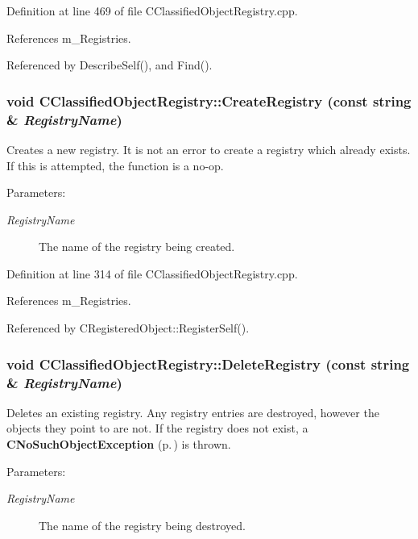 Definition at line 469 of file CClassified\-Object\-Registry.cpp.

References m\_\-Registries.

Referenced by Describe\-Self(), and Find().
\subsubsection{\setlength{\rightskip}{0pt plus 5cm}void CClassified\-Object\-Registry::Create\-Registry (const string \& {\em Registry\-Name})}\label{classCClassifiedObjectRegistry_a3}


Creates a new registry. It is not an error to create a registry which already exists. If this is attempted, the function is a no-op.\begin{Desc}
\item[Parameters: ]\par
\begin{description}
\item[{\em 
Registry\-Name}]The name of the registry being created. \end{description}
\end{Desc}


Definition at line 314 of file CClassified\-Object\-Registry.cpp.

References m\_\-Registries.

Referenced by CRegistered\-Object::Register\-Self().
\subsubsection{\setlength{\rightskip}{0pt plus 5cm}void CClassified\-Object\-Registry::Delete\-Registry (const string \& {\em Registry\-Name})}\label{classCClassifiedObjectRegistry_a4}


Deletes an existing registry. Any registry entries are destroyed, however the objects they point to are not. If the registry does not exist, a {\bf CNo\-Such\-Object\-Exception} {\rm (p.\,\pageref{classCNoSuchObjectException})} is thrown.\begin{Desc}
\item[Parameters: ]\par
\begin{description}
\item[{\em 
Registry\-Name}]The name of the registry being destroyed. \end{description}
\end{Desc}


